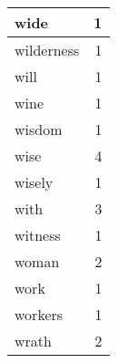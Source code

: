 \begin{center}
\begin{longtable}{l|r}
wide & 1\\ \hline 
wilderness & 1\\ \hline 
will & 1\\ \hline 
wine & 1\\ \hline 
wisdom & 1\\ \hline 
wise & 4\\ \hline 
wisely & 1\\ \hline 
with & 3\\ \hline 
witness & 1\\ \hline 
woman & 2\\ \hline 
work & 1\\ \hline 
workers & 1\\ \hline 
wrath & 2\\ \hline 
\end{longtable}  
\end{center}  


  
\normalsize  

  
  
